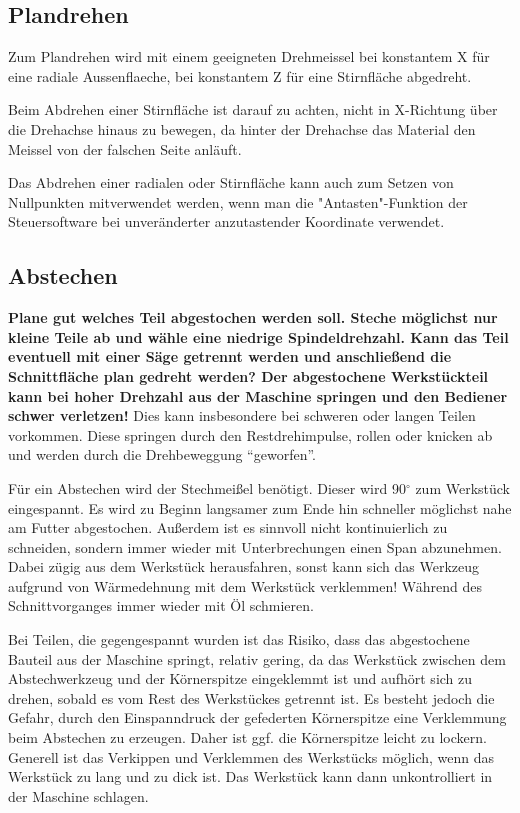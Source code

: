 \documentclass{\basedir/fablab-document}
\begin{document}
\subsection{Plandrehen}
\label{handdrehen:Plandrehen}

Zum Plandrehen wird mit einem geeigneten Drehmeissel bei konstantem X für eine radiale Aussenflaeche, bei konstantem Z für eine Stirnfläche abgedreht.

Beim Abdrehen einer Stirnfläche ist darauf zu achten, nicht in X-Richtung über die Drehachse hinaus zu bewegen, da hinter der Drehachse das Material den Meissel von der falschen Seite anläuft.

Das Abdrehen einer radialen oder Stirnfläche kann auch zum Setzen von Nullpunkten mitverwendet werden, wenn man die "Antasten"-Funktion der Steuersoftware bei unveränderter anzutastender Koordinate verwendet.

\subsection{Abstechen}

\textbf{Plane gut welches Teil abgestochen werden soll. Steche möglichst nur kleine Teile ab und wähle eine niedrige Spindeldrehzahl. Kann das Teil eventuell mit einer Säge getrennt werden und anschließend die Schnittfläche plan gedreht werden? Der abgestochene Werkstückteil kann bei hoher Drehzahl aus der Maschine springen und den Bediener schwer verletzen!} Dies kann insbesondere bei schweren oder langen Teilen vorkommen. Diese springen durch den Restdrehimpulse, rollen oder knicken ab und werden durch die Drehbeweggung \enquote{geworfen}.

Für ein Abstechen wird der Stechmeißel benötigt.
Dieser wird 90$^\circ$ zum Werkstück eingespannt.
Es wird zu Beginn langsamer zum Ende hin schneller möglichst nahe am Futter abgestochen.
Außerdem ist es sinnvoll nicht kontinuierlich zu schneiden, sondern immer wieder mit Unterbrechungen einen Span abzunehmen.
Dabei zügig aus dem Werkstück herausfahren, sonst kann sich das Werkzeug aufgrund von Wärmedehnung mit dem Werkstück verklemmen!
Während des Schnittvorganges immer wieder mit Öl schmieren.

Bei Teilen, die gegengespannt wurden ist das Risiko, dass das abgestochene Bauteil aus der Maschine springt, relativ gering, da das Werkstück zwischen dem Abstechwerkzeug und der Körnerspitze eingeklemmt ist und aufhört sich zu drehen, sobald es vom Rest des Werkstückes getrennt ist. Es besteht jedoch die Gefahr, durch den Einspanndruck der gefederten Körnerspitze eine Verklemmung beim Abstechen zu erzeugen. Daher ist ggf. die Körnerspitze leicht zu lockern. Generell ist das Verkippen und Verklemmen des Werkstücks möglich, wenn das Werkstück zu lang und zu dick ist. Das Werkstück kann dann unkontrolliert in der Maschine schlagen.
\end{document}
